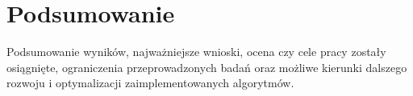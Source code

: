 \cleardoublepage
\chapter*{Podsumowanie}

Podsumowanie wyników, najważniejsze wnioski, ocena czy cele pracy zostały osiągnięte, ograniczenia przeprowadzonych badań oraz możliwe kierunki dalszego rozwoju i optymalizacji zaimplementowanych algorytmów.